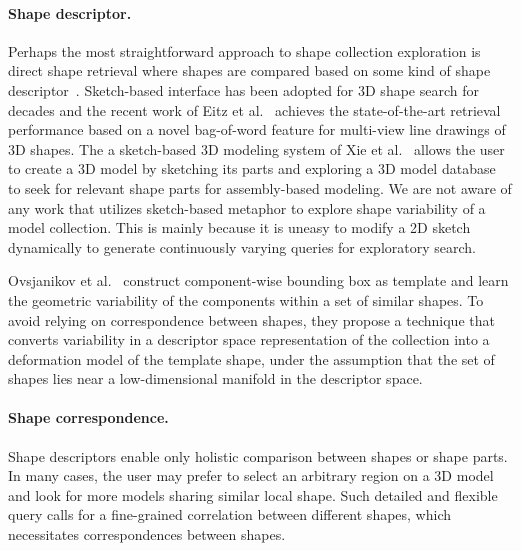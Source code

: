 \paragraph*{Shape descriptor.}
Perhaps the most straightforward approach to shape collection exploration is direct shape retrieval where shapes are
compared based on some kind of shape descriptor~\cite{Tangelder:2008:SCB}.
%
Sketch-based interface has been adopted for 3D shape search for decades and
the recent work of Eitz et al.~ achieves the state-of-the-art retrieval performance
based on a novel bag-of-word feature for multi-view line drawings of 3D shapes.
The a sketch-based 3D modeling system of Xie et al.~ allows the user to create
a 3D model by sketching its parts and exploring a 3D model database to seek for
relevant shape parts for assembly-based modeling.
We are not aware of any work that utilizes sketch-based metaphor to explore shape variability of a model collection.
This is mainly because it is uneasy to modify a 2D sketch dynamically to generate continuously varying queries for exploratory search.

Ovsjanikov et al.~\cite{Ovsjanikov:2011:ECV} construct component-wise bounding box as template and learn the geometric variability of the components
within a set of similar shapes. To avoid relying on correspondence between shapes, they propose a technique that
converts variability in a descriptor space representation of the collection into a deformation model of the template shape,
under the assumption that the set of shapes lies near a low-dimensional manifold in the descriptor space.



\paragraph*{Shape correspondence.}
Shape descriptors enable only holistic comparison between shapes or shape parts.
In many cases, the user may prefer to select an arbitrary region on a 3D model and look for more models sharing similar local shape.
Such detailed and flexible query calls for a fine-grained correlation between different shapes, which necessitates correspondences between shapes.

